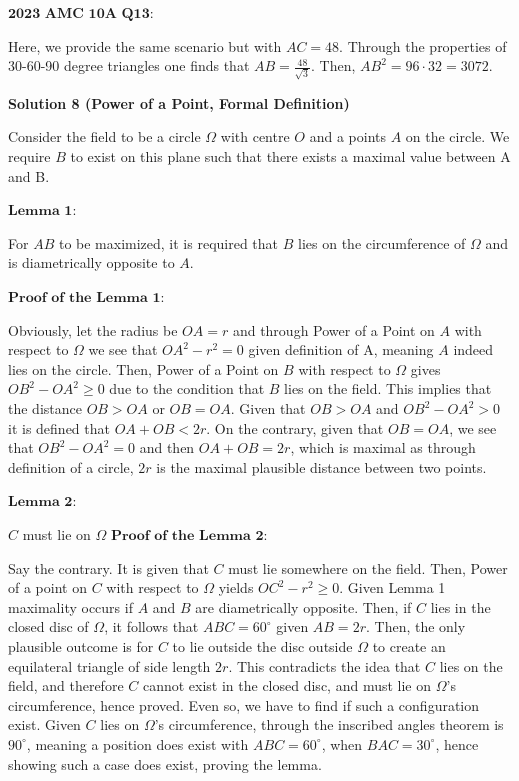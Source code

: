 \begin{enumerate}
 $\textbf{2023 AMC 10A Q13}$:

 Here, we provide the same scenario but with $AC = 48$. Through the properties of 30-60-90 degree triangles one finds that $AB = \frac{48}{\sqrt{3}}$. Then, $AB^2 = 96 \cdot 32 = \boxed{3072}$.

 



\textbf{Solution 8 (Power of a Point, Formal Definition)}

Consider the field to be a circle $\Omega$ with centre $O$ and a points $A$ on the circle. We require $B$ to exist on this plane such that there exists a maximal value between A and B. 

 $\textbf{Lemma 1}$:

 For $AB$ to be maximized, it is required that $B$ lies on the circumference of $\Omega$ and is diametrically opposite to $A$.

 $\textbf{Proof of the Lemma 1}$:

 Obviously, let the radius be $OA = r$ and through Power of a Point on $A$ with respect to $\Omega$ we see that $OA^2 - r^2 = 0$ given definition of A, meaning $A$ indeed lies on the circle. Then, Power of a Point on $B$ with respect to $\Omega$ gives $OB^2 - OA^2 \ge 0$ due to the condition that $B$ lies on the field. This implies that the distance $OB > OA$ or $OB = OA$. Given that $OB > OA$ and $OB^2 - OA^2 > 0$ it is defined that $OA+OB < 2r$. On the contrary, given that $OB = OA$, we see that $OB^2 - OA^2 = 0$ and then $OA + OB = 2r$, which is maximal as through definition of a circle, $2r$ is the maximal plausible distance between two points.

 $\textbf{Lemma 2}$:

 $C$ must lie on $\Omega$
$\textbf{Proof of the Lemma 2}$:

 Say the contrary. It is given that $C$ must lie somewhere on the field. Then, Power of a point on $C$ with respect to $\Omega$ yields $OC^2 - r^2 \ge 0$. Given Lemma 1 maximality occurs if $A$ and $B$ are diametrically opposite. Then, if $C$ lies in the closed disc of $\Omega$, it follows that $ABC = 60^\circ$ given $AB = 2r$. Then, the only plausible outcome is for $C$ to lie outside the disc outside $\Omega$ to create an equilateral triangle of side length $2r$. This contradicts the idea that $C$ lies on the field, and therefore $C$ cannot exist in the closed disc, and must lie on $\Omega$'s circumference, hence proved. Even so, we have to find if such a configuration exist. Given $C$ lies on $\Omega$'s circumference, through the inscribed angles theorem is $90^\circ$, meaning a position does exist with $ABC = 60^\circ$, when $BAC = 30^\circ$, hence showing such a case does exist, proving the lemma.


\end{enumerate}
